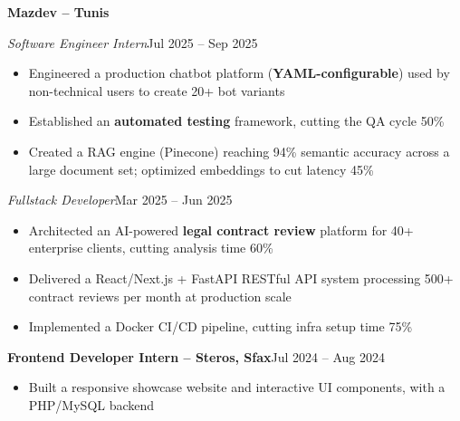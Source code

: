 \documentclass[10pt,a4paper]{article}
\newcommand{\entry}[2]{\vspace{1pt}\noindent\textbf{#1}\hfill{\color{muted}#2}\par}
\newcommand{\subentry}[2]{\noindent\textit{#1}\hfill{\color{muted}#2}\par}
\begin{document}
\entry{Mazdev -- Tunis}{}
\subentry{Software Engineer Intern}{Jul 2025 -- Sep 2025}
\begin{itemize}
  \item Engineered a production chatbot platform (\textbf{YAML-configurable}) used by non-technical users to create 20+ bot variants
  \item Established an \textbf{automated testing} framework, cutting the QA cycle 50\%
  \item Created a RAG engine (Pinecone) reaching 94\% semantic accuracy across a large document set; optimized embeddings to cut latency 45\%
\end{itemize}
\subentry{Fullstack Developer}{Mar 2025 -- Jun 2025}
\begin{itemize}
  \item Architected an AI-powered \textbf{legal contract review} platform for 40+ enterprise clients, cutting analysis time 60\%
  \item Delivered a React/Next.js + FastAPI RESTful API system processing 500+ contract reviews per month at production scale
  \item Implemented a Docker CI/CD pipeline, cutting infra setup time 75\%
\end{itemize}

\entry{Frontend Developer Intern -- Steros, Sfax}{Jul 2024 -- Aug 2024}
\begin{itemize}
  \item Built a responsive showcase website and interactive UI components, with a PHP/MySQL backend
\end{itemize}
\end{document}
